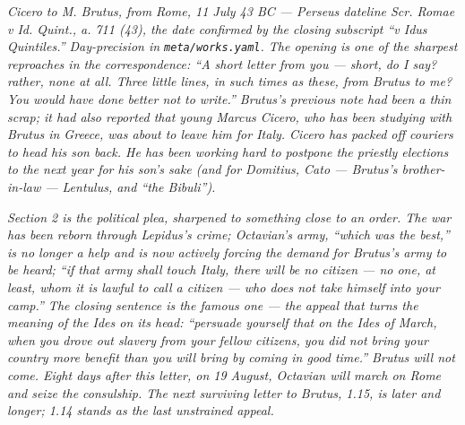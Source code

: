 
\textit{Cicero to M. Brutus, from Rome, 11 July 43 BC
--- Perseus dateline \textit{Scr. Romae v Id. Quint., a.
711 (43)}, the date confirmed by the closing subscript
``\textit{v Idus Quintiles}.'' Day-precision in
\texttt{meta/works.yaml}. The opening is one of the
sharpest reproaches in the correspondence: ``A short
letter from you --- short, do I say? rather, none at all.
Three little lines, in such times as these, from Brutus
to me? You would have done better not to write.''
Brutus's previous note had been a thin scrap; it had
also reported that young Marcus Cicero, who has been
studying with Brutus in Greece, was about to leave him
for Italy. Cicero has packed off couriers to head his
son back. He has been working hard to postpone the
priestly elections to the next year for his son's sake
(and for Domitius, Cato --- Brutus's brother-in-law ---
Lentulus, and ``the Bibuli'').}

\textit{Section 2 is the political plea, sharpened to
something close to an order. The war has been reborn
through Lepidus's crime; Octavian's army, ``which was
the best,'' is no longer a help and is now actively
forcing the demand for Brutus's army to be heard;
``if that army shall touch Italy, there will be no
citizen --- no one, at least, whom it is lawful to call
a citizen --- who does not take himself into your
camp.'' The closing sentence is the famous one ---
the appeal that turns the meaning of the Ides on its
head: ``persuade yourself that on the Ides of March,
when you drove out slavery from your fellow citizens,
you did not bring your country more benefit than you
will bring by coming in good time.'' Brutus will not
come. Eight days after this letter, on 19 August,
Octavian will march on Rome and seize the consulship.
The next surviving letter to Brutus, 1.15, is later
and longer; 1.14 stands as the last unstrained appeal.}
